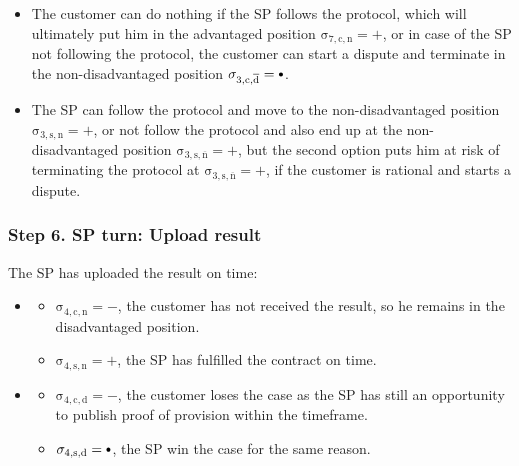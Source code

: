 \documentclass{ieeeaccess}
\newcommand\neutral[1][.75]{\mathbin{\ThisStyle{\vcenter{\hbox{%
  \scalebox{#1}{$\SavedStyle\bullet$}}}}}%
}
\begin{document}
\begin{itemize}
  \item The customer can do nothing if the SP follows the protocol, which will ultimately put him in the advantaged position \(\operatorname{\sigma_{7, c, n} = +}\), or in case of the SP not following the protocol, the customer can start a dispute and terminate in the non-disadvantaged position \(\operatorname{\sigma_{3, c, \overline{d}} = \neutral}\).
  \item The SP can follow the protocol and move to the non-disadvantaged position \(\operatorname{\sigma_{3, s, n} = +}\), or not follow the protocol and also end up at the non-disadvantaged position \(\operatorname{\sigma_{3, s, \overline{n}} = +}\), but the second option puts him at risk of terminating the protocol at \(\operatorname{\sigma_{3, s, \overline{n}} = +}\), if the customer is rational and starts a dispute.
\end{itemize}

\subsubsection{Step 6. SP turn: Upload result}\label{step-6-publication-of-results}

The SP has uploaded the result on time:


\begin{itemize}
\item \AgreeablePath
  \begin{itemize}
  
  \item
    \(\operatorname{\sigma_{4, c, n} = -}\), the customer has not received the result, so he remains in the disadvantaged position. 
  \item
    \(\operatorname{\sigma_{4, s, n} = +}\), the SP has fulfilled the contract on time.
  \end{itemize}
\item \DisputePath

  \begin{itemize}
  
  \item
    \(\operatorname{\sigma_{4, c, d} = -}\), the customer loses the case as the SP has still an opportunity to publish proof of provision within the timeframe. 
  \item
    \(\operatorname{\sigma_{4, s, d} = \neutral}\), the SP win the case for the same reason.
  \end{itemize}
\end{itemize}
\end{document}
